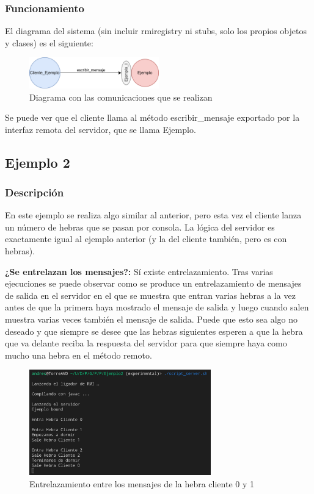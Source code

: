 \documentclass{article}
\begin{document}
\subsubsection{Funcionamiento}
El diagrama del sistema (sin incluir rmiregistry ni stubs, solo los propios objetos y clases) es el siguiente:

\begin{figure}[H]
    \centering
    \includegraphics[width=0.5\textwidth]{imagenes/E1Diagrama.png}
    \caption{Diagrama con las comunicaciones que se realizan}
\end{figure}

Se puede ver que el cliente llama al método escribir\_mensaje exportado por la interfaz remota del servidor, que se llama Ejemplo.

\subsection{Ejemplo 2}
\subsubsection{Descripción}
En este ejemplo se realiza algo similar al anterior, pero esta vez el cliente lanza un número de hebras que se pasan por consola. La lógica del servidor es exactamente igual al ejemplo anterior (y la del cliente también, pero es con hebras).

\textbf{¿Se entrelazan los mensajes?: }Sí existe entrelazamiento. Tras varias ejecuciones se puede observar como se produce un entrelazamiento de mensajes de salida en el servidor en el que se muestra que entran varias hebras a la vez antes de que la primera haya mostrado el mensaje de salida y luego cuando salen muestra varias veces también el mensaje de salida. Puede que esto sea algo no deseado y que siempre se desee que las hebras siguientes esperen a que la hebra que va delante reciba la respuesta del servidor para que siempre haya como mucho una hebra en el método remoto.

\begin{figure}[H]
    \centering
    \includegraphics[width=0.7\textwidth]{imagenes/E2Server1.png}
    \caption{Entrelazamiento entre los mensajes de la hebra cliente 0 y 1}
\end{figure}
\end{document}
